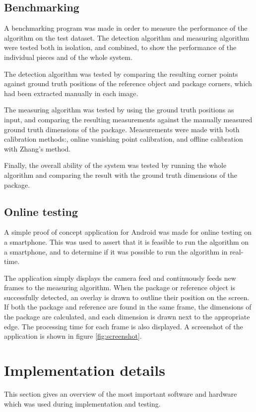 \subsection{Benchmarking} \label{benchmarking}
A benchmarking program was made in order to measure the performance of the algorithm on the test dataset.
The detection algorithm and measuring algorithm were tested both in isolation, and combined, to show the performance of the individual pieces and of the whole system. 

The detection algorithm was tested by comparing the resulting corner points against ground truth positions of the reference object and package corners, which had been extracted manually in each image.

The measuring algorithm was tested by using the ground truth positions as input, and comparing the resulting measurements against the manually measured ground truth dimensions of the package.
Measurements were made with both calibration methods:, online vanishing point calibration, and offline calibration with Zhang's method. 

Finally, the overall ability of the system was tested by running the whole algorithm and comparing the result with the ground truth dimensions of the package. 

\subsection{Online testing} \label{method:online_testing}
A simple proof of concept application for Android was made for online testing on a smartphone.
This was used to assert that it is feasible to run the algorithm on a smartphone, and to determine if it was possible to run the algorithm in real-time.

The application simply displays the camera feed and continuously feeds new frames to the measuring algorithm.
When the package or reference object is successfully detected, an overlay is drawn to outline their position on the screen.
If both the package and reference are found in the same frame, the dimensions of the package are calculated, and each dimension is drawn next to the appropriate edge.
The processing time for each frame is also displayed.
A screenshot of the application is shown in figure \ref{fig:screenshot}.

\section{Implementation details}
This section gives an overview of the most important software and hardware which was used during implementation and testing.

